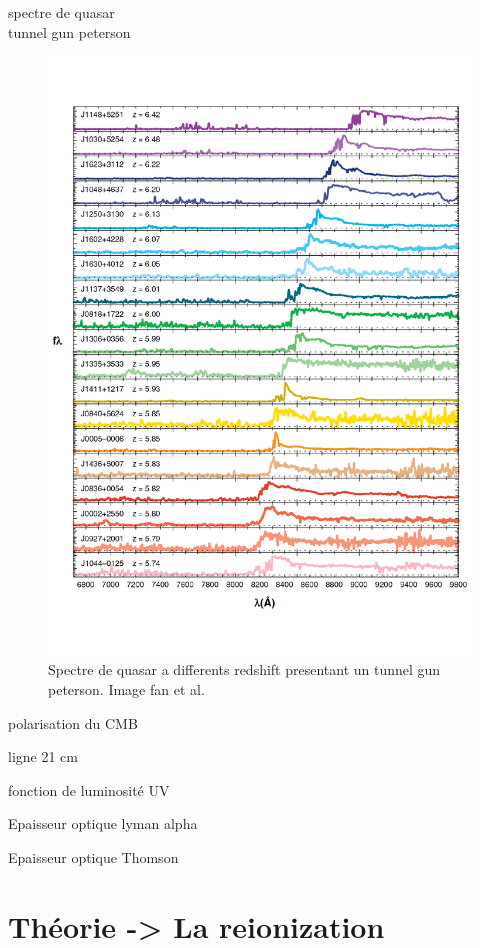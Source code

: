 spectre de quasar\\
tunnel gun peterson
\begin{figure}[bth]
        \includegraphics[width=.95\linewidth]{img/01/quasar_spectre.pdf} 
        \caption{Spectre de quasar a differents redshift presentant un tunnel gun peterson.
        Image fan et al.}
 		\label{fig:spectre_quasar}
\end{figure}


polarisation du CMB

ligne 21 cm

fonction de luminosité UV

Epaisseur optique lyman alpha

Epaisseur optique Thomson

\section{Théorie -> La reionization}

